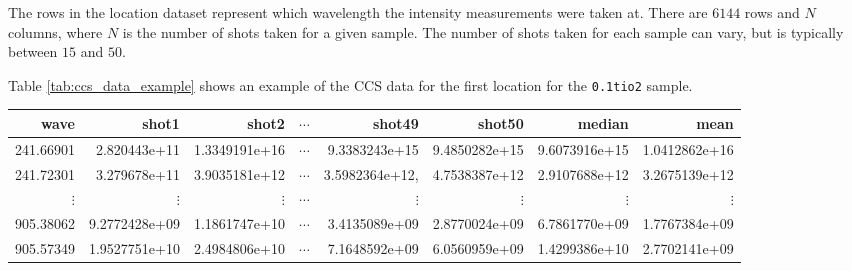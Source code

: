 The rows in the location dataset represent which wavelength the intensity measurements were taken at.
There are $6144$ rows and $N$ columns, where $N$ is the number of shots taken for a given sample.
The number of shots taken for each sample can vary, but is typically between $15$ and $50$.

Table \ref{tab:ccs_data_example} shows an example of the CCS data for the first location for the \texttt{0.1tio2} sample.

\begin{table*}[ht]
\centering
\begin{tabular}{rrrrrrrr}
\toprule
     wave &        shot1 &      shot2 &      $\cdots$ &       shot49 &       shot50 & median & mean \\
\midrule
241.66901 & 2.820443e+11 & 1.3349191e+16 & $\cdots$ & 9.3383243e+15 & 9.4850282e+15 & 9.6073916e+15 & 1.0412862e+16 \\
241.72301 & 3.279678e+11 & 3.9035181e+12 & $\cdots$ & 3.5982364e+12, & 4.7538387e+12 & 2.9107688e+12 & 3.2675139e+12 \\
$\vdots$  & $\vdots$     & $\vdots$ & $\cdots$ & $\vdots$ & $\vdots$ & $\vdots$ & $\vdots$ \\
905.38062 & 9.2772428e+09 & 1.1861747e+10 & $\cdots$ & 3.4135089e+09 & 2.8770024e+09 & 6.7861770e+09 & 1.7767384e+09 \\
905.57349 & 1.9527751e+10 & 2.4984806e+10 & $\cdots$ & 7.1648592e+09 & 6.0560959e+09 & 1.4299386e+10 & 2.7702141e+09 \\ 
\bottomrule
\end{tabular}
\caption{Example of CCS data for the first sample in the \texttt{0.1tio2} directory.}
\label{tab:ccs_data_example}
\end{table*}
